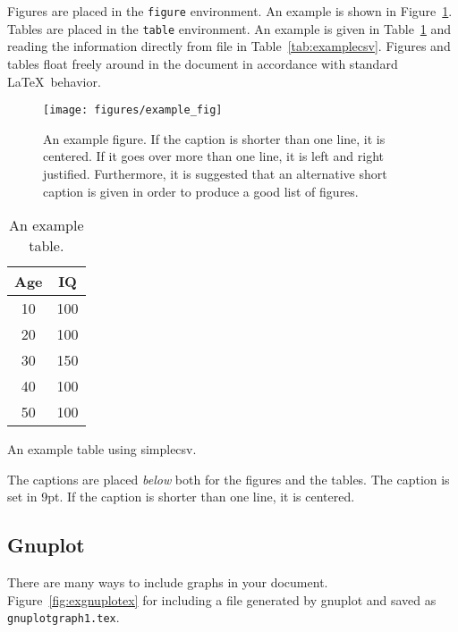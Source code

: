 Figures are placed in the \texttt{figure} environment. An example is
shown in Figure~\ref{fig:example}. %
Tables are placed in the \texttt{table} environment. An example is given in
Table~\ref{tab:example} and reading the information directly from file in Table~\ref{tab:examplecsv}. Figures and tables float freely around in the
document in accordance with standard \LaTeX\ behavior.

\begin{figure}[tbp]  %
  \centering
  \texttt{[image: figures/example\_fig]}
  \caption[An example figure.]{An example figure. If the caption is
    shorter than one line, it is centered. If it goes over more than
    one line, it is left and right justified. Furthermore, it is
    suggested that an alternative short caption is given in order to
    produce a good list of figures.}
  \label{fig:example}
\end{figure}

\begin{table}[tbp]
  \centering
  \begin{tabular}{c|c}
    Age  & IQ  \\ 
    \hline
    10   & 100 \\
    20   & 100 \\
    30   & 150 \\
    40   & 100 \\
    50   & 100
  \end{tabular}
  \caption{An example table.}
  \label{tab:example}
\end{table}

\begin{table}[tbp]
  \centering
  \caption{An example table using simplecsv.}
  \label{tab:examplecsv}
\end{table}

The captions are placed \emph{below} both for the figures and the
tables. The caption is set in 9pt. If the caption is shorter than one
line, it is centered.

\subsection{Gnuplot}
There are many ways to include graphs in your document.  Figure~\ref{fig:exgnuplotex} for including a file generated by gnuplot and saved as \texttt{gnuplotgraph1.tex}. 

